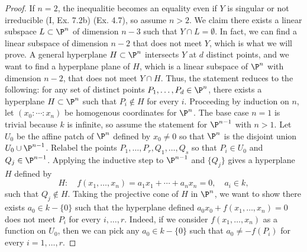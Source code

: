 \documentclass[a4paper]{article}
\begin{document}
\begin{enumerate} [label=\textbf{\arabic*.}, leftmargin=0em]
        \begin{proof}
          If $n = 2$, the inequalitie becomes an equality even if $Y$ is singular or not irreducible (I, Ex. 7.2b) (Ex. 4.7), so assume $n > 2$.
          We claim there exists a linear subspace $L \subset \P^n$ of dimension $n - 3$ such that $Y \cap L = \emptyset$.
          In fact, we can find a linear subspace of dimension $n - 2$ that does not meet $Y$, which is what we will prove.
          A general hyperplane $H \subset \P^n$ intersects $Y$ at $d$ distinct points, and we want to find a hyperplane plane of $H$, which is a linear subspace of $\P^n$ with dimension $n - 2$, that does not meet $Y \cap H$.
          Thus, the statement reduces to the following: for any set of distinct points $P_1, \dots, P_d \in \P^n$, there exists a hyperplane $H \subset \P^n$ such that $P_i \notin H$ for every $i$.
          Proceeding by induction on $n$, let $(x_0 : \cdots : x_n)$ be homogenous coordinates for $\P^n$.
          The base case $n = 1$ is trivial because $k$ is infinite, so assume the statement for $\P^{n - 1}$ with $n > 1$.
          Let $U_0$ be the affine patch of $\P^n$ defined by $x_0 \neq 0$ so that $\P^n$ is the disjoint union $U_0 \cup \P^{n - 1}$.
          Relabel the points $P_1, \dots, P_{r}, Q_1, \dots, Q_s$ so that $P_i \in U_0$ and $Q_j \in \P^{n - 1}$.
          Applying the inductive step to $\P^{n - 1}$ and $\{Q_j\}$ gives a hyperplane $H$ defined by $$H : \quad f(x_1, \dots, x_n) = a_1x_1 + \cdots + a_nx_n = 0, \quad a_i \in k,$$ such that $Q_j \notin H$.
          Taking the projective cone of $H$ in $\P^n$, we want to show there exists $a_0 \in k - \{0\}$ such that the hyperplane defined $a_0x_0 + f(x_1, \dots, x_n) = 0$ does not meet $P_i$ for every $i, \dots, r$.
          Indeed, if we consider $f(x_1, \dots, x_n)$ as a function on $U_0$, then we can pick any $a_0 \in k - \{0\}$ such that $a_0 \neq -f(P_i)$ for every $i = 1, \dots, r$.


\end{proof}
\end{enumerate}
\end{document}
